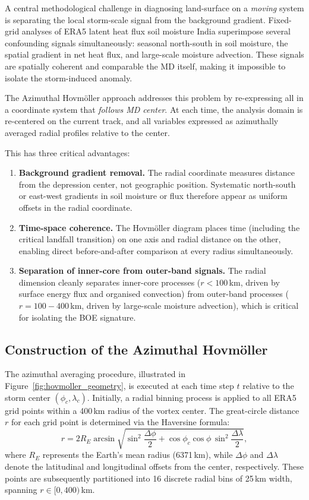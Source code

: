 A central methodological challenge in diagnosing land-surface on a
\emph{moving} system is separating the local storm-scale signal from
the background gradient. Fixed-grid analyses of ERA5 latent heat flux
soil moisture India superimpose several confounding signals
simultaneously: seasonal north-south in soil moisture, the spatial
gradient in net heat flux, and large-scale moisture advection. These
signals are spatially coherent and comparable the MD itself, making it
impossible to isolate the storm-induced anomaly.

The Azimuthal Hovm\"{o}ller approach addresses this problem by
re-expressing all in a coordinate system that \emph{follows MD
center}. At each time, the analysis domain is re-centered on the
current track, and all variables expressed as azimuthally averaged
radial profiles relative to the center.

This has three critical advantages:
\begin{enumerate}
  \item \textbf{Background gradient removal.} The radial coordinate
    measures distance from the depression center, not geographic
    position. Systematic north-south or east-west gradients in soil
    moisture or flux therefore appear as uniform offsets in the
    radial coordinate.
  \item \textbf{Time-space coherence.} The Hovm\"{o}ller diagram
    places time (including the critical landfall transition) on one
    axis and radial distance on the other, enabling direct
    before-and-after comparison at every radius simultaneously.
  \item \textbf{Separation of inner-core from outer-band signals.}
    The radial dimension cleanly separates inner-core processes ($r <
    100$\,km, driven by surface energy flux and organised convection)
    from outer-band processes ($r = 100-400$\,km, driven by
    large-scale moisture advection), which is critical for isolating
    the BOE signature.
\end{enumerate}

\subsection{Construction of the Azimuthal Hovm\texorpdfstring{\"{o}}{o}ller}
\label{subsec:hovmoller_construction}

The azimuthal averaging procedure, illustrated in
Figure~\ref{fig:hovmoller_geometry}, is executed at each time step
$t$ relative to the storm center $(\phi_c, \lambda_c)$. Initially, a
radial binning process is applied to all ERA5 grid points within a
400\,km radius of the vortex center. The great-circle distance $r$
for each grid point is determined via the Haversine formula:
\begin{equation}
  r = 2R_E \arcsin\!\sqrt{\sin^2\!\frac{\Delta\phi}{2} +
  \cos\phi_c\cos\phi\,\sin^2\!\frac{\Delta\lambda}{2}},
  \label{eq:haversine}
\end{equation}
where $R_E$ represents the Earth’s mean radius (6371\,km), while
$\Delta\phi$ and $\Delta\lambda$ denote the latitudinal and
longitudinal offsets from the center, respectively. These points are
subsequently partitioned into 16 discrete radial bins of 25\,km
width, spanning $r \in [0, 400)$\,km.

